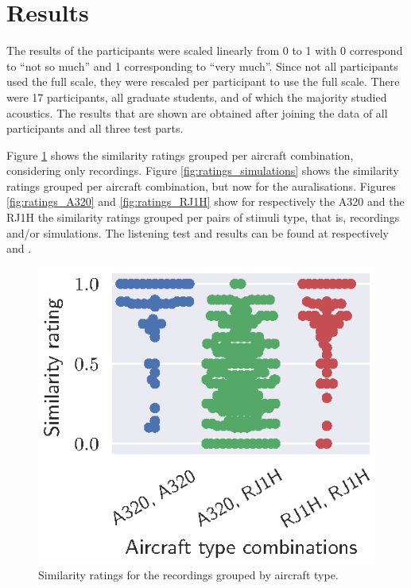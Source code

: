 \section{Results}
The results of the participants were scaled linearly from 0 to 1 with 0
correspond to ``not so much'' and 1 corresponding to ``very much''. Since not
all participants used the full scale, they were rescaled per participant to use
the full scale. There were 17 participants, all graduate students, and of which
the majority studied acoustics. The results that are shown are obtained after
joining the data of all participants and all three test parts.

Figure \ref{fig:ratings_recordings} shows the similarity ratings grouped per
aircraft combination, considering only recordings. Figure
\ref{fig:ratings_simulations} shows the similarity ratings grouped per
aircraft combination, but now for the auralisations.
Figures \ref{fig:ratings_A320} and \ref{fig:ratings_RJ1H} show
for respectively the A320 and the RJ1H the similarity ratings grouped per pairs
of stimuli type, that is, recordings and/or simulations.
The listening test and results can be found at respectively \cite{Rietdijk2017a} and \cite{Rietdijk2017b}.


\begin{figure}[H]
  \centering
  \includegraphics[]{../figures/manual/auralisation-paper/figure1_ratings_recordings}
  \caption{Similarity ratings for the recordings grouped by aircraft type.}
  \label{fig:ratings_recordings}
\end{figure}

